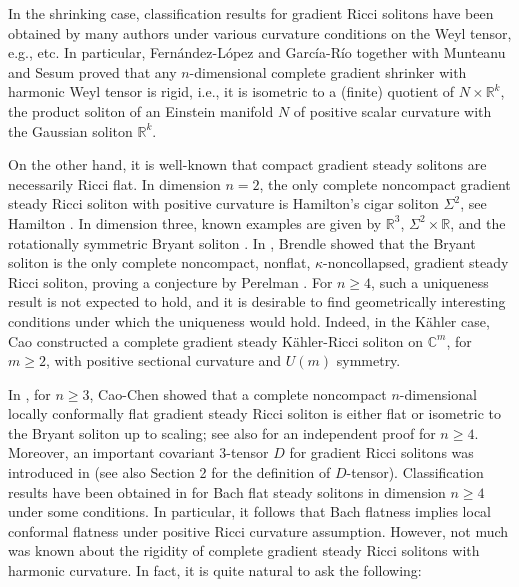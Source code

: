 \documentclass{amsart}
\theoremstyle{definition}
\theoremstyle{remark}
\numberwithin{equation}{section}
\begin{document}
In the shrinking case, classification results for gradient Ricci solitons have been obtained by many authors under various curvature conditions on the Weyl tensor, e.g., \cite{Iv3, P, ELM, Naber, NW, CCZ, PW2, CWZ, Z,  FG, MS, CC2, CW,WWW} etc. 
In particular, Fern\'{a}ndez-L\'{o}pez and Garc\'{i}a-R\'{i}o \cite{FG} together with Munteanu and Sesum \cite{MS} proved that any $n$-dimensional complete gradient shrinker with harmonic Weyl tensor is rigid, i.e., it is isometric to a (finite) quotient of $N \times \mathbb{R}^k$, the product soliton of an Einstein manifold $N$ of positive scalar curvature with the Gaussian soliton $\mathbb{R}^k$. 

On the other hand, it is well-known that compact gradient steady solitons are necessarily Ricci flat.
In dimension $n=2$, the only complete noncompact gradient steady Ricci soliton with positive curvature is Hamilton's cigar soliton $\Sigma^2$, see Hamilton \cite{Ha95F}. In dimension three, known examples are given by $\mathbb R^{3}$, $\Sigma^{2}\times \mathbb R$, and the rotationally symmetric Bryant soliton \cite{Bryant}. In \cite{Br}, Brendle showed that the Bryant soliton is the only complete noncompact, nonflat, $\kappa$-noncollapsed, gradient steady Ricci soliton,  proving a conjecture by Perelman \cite{P}. For $n\ge 4$, such a uniqueness result is not expected to hold, and it is desirable to find geometrically interesting conditions under which the uniqueness would hold. Indeed, in the K\"ahler case, Cao \cite{Cao2} constructed a complete gradient steady K\"ahler-Ricci soliton on $\mathbb{C}^m$, for $m\geq 2$, with positive sectional curvature and $U(m)$ symmetry. 

In \cite{CC1}, for $n\ge 3$, Cao-Chen showed that a complete noncompact $n$-dimensional locally conformally flat gradient steady Ricci soliton is either flat or isometric to the Bryant soliton up to scaling; see also \cite{CM} for an independent proof for $n\ge 4$.  Moreover, an important covariant $3$-tensor $D$ for gradient Ricci solitons was introduced in \cite{CC1, CC2} (see also Section 2 for the definition of $D$-tensor). 
Classification results have been obtained in \cite{CCCMM} for Bach flat steady solitons in dimension $n\geq 4$ under some conditions. In particular,  it follows that Bach flatness implies local conformal flatness under positive Ricci curvature assumption.  However, not much was known about the rigidity of complete gradient steady Ricci solitons with harmonic curvature. In fact, it is quite natural to ask the following: 
\end{document}
